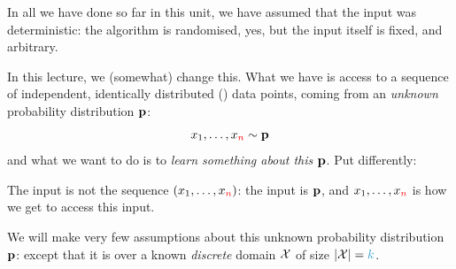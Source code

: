 In all we have done so far in this unit, we have assumed that the input was deterministic: the algorithm is randomised, yes, but the input itself is fixed, and arbitrary.

In this lecture, we (somewhat) change this. What we have is access to a sequence of independent, identically distributed (\iid) data points, coming from an \emph{unknown} probability distribution $\mathbf{p}$:
\[
    x_1,\dots, x_{\textcolor{red}{n}} \sim \mathbf{p}
\]
and what we want to do is to \emph{learn something about this $\mathbf{p}$}. Put differently:
\begin{framed}
    \noindent The input is not the \iid sequence $(x_1,\dots, x_{\textcolor{red}{n}})$: the input is $\mathbf{p}$, and  $x_1,\dots, x_{\textcolor{red}{n}}$ is how we get to access this input.
\end{framed}
We will make very few assumptions about this unknown probability distribution $\mathbf{p}$: except that it is over a known \emph{discrete} domain $\mathcal{X}$ of size $\abs{\domain} = \ab$. 

